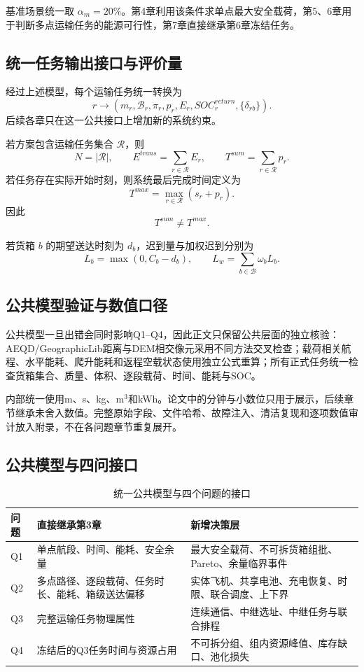 \documentclass[UTF8,a4paper,12pt]{ctexart}
\begin{document}
基准场景统一取 $\alpha_m=20\%$。第4章利用该条件求单点最大安全载荷，第5、6章用于判断多点运输任务的能源可行性，第7章直接继承第6章冻结任务。

\subsection{统一任务输出接口与评价量}

经过上述模型，每个运输任务统一转换为
\[
r
\longrightarrow
\left(
m_r,\mathcal B_r,\pi_r,p_r,E_r,SOC_r^{return},\{\delta_{rb}\}
\right).
\]
后续各章只在这一公共接口上增加新的系统约束。

若方案包含运输任务集合 $\mathcal R$，则
\[
N=|\mathcal R|,
\qquad
E^{trans}=\sum_{r\in\mathcal R}E_r,
\qquad
T^{sum}=\sum_{r\in\mathcal R}p_r.
\]
若任务存在实际开始时刻，则系统最后完成时间定义为
\[
T^{max}
=
\max_{r\in\mathcal R}(s_r+p_r).
\]
因此
\[
\boxed{T^{sum}\neq T^{max}}.
\]

若货箱 $b$ 的期望送达时刻为 $d_b$，迟到量与加权迟到分别为
\[
L_b=\max(0,C_b-d_b),
\qquad
L_w=\sum_{b\in\mathcal B}\omega_bL_b.
\]

\subsection{公共模型验证与数值口径}

公共模型一旦出错会同时影响Q1--Q4，因此正文只保留公共层面的独立核验：AEQD/GeographicLib距离与DEM相交像元采用不同方法交叉检查；载荷相关航程、水平能耗、爬升能耗和返程空载状态使用独立公式重算；所有正式任务统一检查货箱集合、质量、体积、逐段载荷、时间、能耗与SOC。

内部统一使用m、s、kg、m$^3$和kWh。论文中的分钟与小数位只用于展示，后续章节继承未舍入数值。完整原始字段、文件哈希、故障注入、清洁复现和逐项数值审计放入附录，不在各问题章节重复展开。

\subsection{公共模型与四问接口}

\begin{table}[H]
\centering
\caption{统一公共模型与四个问题的接口}
\label{tab:common_interface}
\begin{tabular}{p{1.3cm}p{6.0cm}p{7.0cm}}
\toprule
问题 & 直接继承第3章 & 新增决策层\\
\midrule
Q1 & 单点航段、时间、能耗、安全余量 & 最大安全载荷、不可拆货箱组批、Pareto、余量临界事件\\
Q2 & 多点路径、逐段载荷、任务时长、能耗、箱级送达偏移 & 实体飞机、共享电池、充电恢复、时限、联合调度、上下界\\
Q3 & 完整运输任务物理属性 & 连续通信、中继选址、中继任务与联合排程\\
Q4 & 冻结后的Q3任务时间与资源占用 & 不可拆分组、组内资源峰值、库存缺口、池化损失\\
\bottomrule
\end{tabular}
\end{table}
\end{document}
